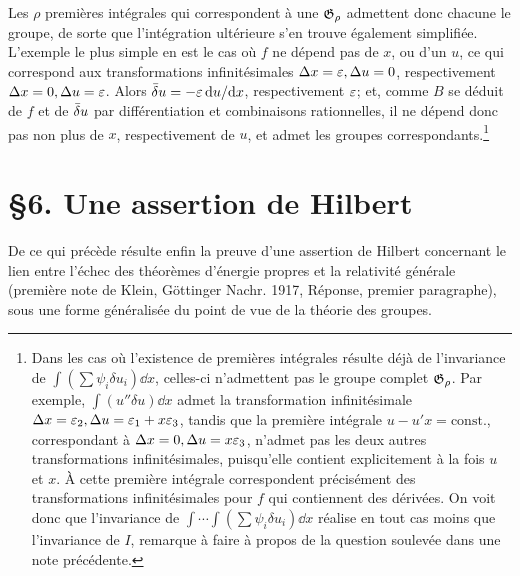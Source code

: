Les \(\rho\) premières intégrales qui correspondent à une \(\mathfrak G_\rho\) admettent donc chacune le groupe, de sorte que l'intégration ultérieure s'en trouve également simplifiée. L'exemple le plus simple en est le cas où \(f\) ne dépend pas de \(x\), ou d'un \(u\), ce qui correspond aux transformations infinitésimales \(\Delta x=\varepsilon,\Delta u=0\), respectivement \(\Delta x=0,\Delta u=\varepsilon\). Alors \(\bar{\delta} u=-\varepsilon\,\mathrm d u/\mathrm d x\), respectivement \(\varepsilon\); et, comme \(B\) se déduit de \(f\) et de \(\bar{\delta} u\) par différentiation et combinaisons rationnelles, il ne dépend donc pas non plus de \(x\), respectivement de \(u\), et admet les groupes correspondants.\footnote{Dans les cas où l'existence de premières intégrales résulte déjà de l'invariance de \(\int(\sum\psi_i\delta u_i)\dd x\), celles-ci n'admettent pas le groupe complet \(\mathfrak G_\rho\). Par exemple, \(\int(u''\delta u)\dd x\) admet la transformation infinitésimale \(\Delta x=\varepsilon_2,\Delta u=\varepsilon_1+x\varepsilon_3\), tandis que la première intégrale \(u-u'x=\mathrm{const.}\), correspondant à \(\Delta x=0,\Delta u=x\varepsilon_3\), n'admet pas les deux autres transformations infinitésimales, puisqu'elle contient explicitement à la fois \(u\) et \(x\). À cette première intégrale correspondent précisément des transformations infinitésimales pour \(f\) qui contiennent des dérivées. On voit donc que l'invariance de \(\int\!\cdots\!\int(\sum\psi_i\delta u_i)\dd x\) réalise en tout cas moins que l'invariance de \(I\), remarque à faire à propos de la question soulevée dans une note précédente.}

\section*{\S{}6. Une assertion de Hilbert}

De ce qui précède résulte enfin la preuve d'une assertion de Hilbert concernant le lien entre l'échec des théorèmes d'énergie propres et la \og relativité générale \fg{} (première note de Klein, Göttinger Nachr. 1917, Réponse, premier paragraphe), sous une forme généralisée du point de vue de la théorie des groupes.

